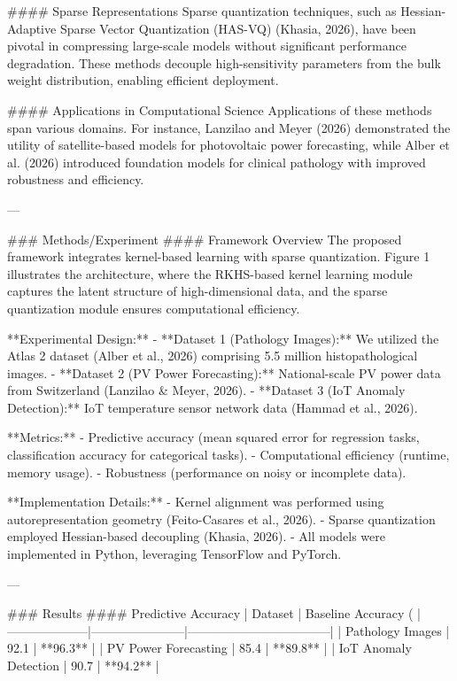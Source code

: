 #### Sparse Representations
Sparse quantization techniques, such as Hessian-Adaptive Sparse Vector Quantization (HAS-VQ) (Khasia, 2026), have been pivotal in compressing large-scale models without significant performance degradation. These methods decouple high-sensitivity parameters from the bulk weight distribution, enabling efficient deployment.

#### Applications in Computational Science
Applications of these methods span various domains. For instance, Lanzilao and Meyer (2026) demonstrated the utility of satellite-based models for photovoltaic power forecasting, while Alber et al. (2026) introduced foundation models for clinical pathology with improved robustness and efficiency.

---

### Methods/Experiment
#### Framework Overview
The proposed framework integrates kernel-based learning with sparse quantization. Figure 1 illustrates the architecture, where the RKHS-based kernel learning module captures the latent structure of high-dimensional data, and the sparse quantization module ensures computational efficiency.

**Experimental Design:**
- **Dataset 1 (Pathology Images):** We utilized the Atlas 2 dataset (Alber et al., 2026) comprising 5.5 million histopathological images.
- **Dataset 2 (PV Power Forecasting):** National-scale PV power data from Switzerland (Lanzilao & Meyer, 2026).
- **Dataset 3 (IoT Anomaly Detection):** IoT temperature sensor network data (Hammad et al., 2026).

**Metrics:**
- Predictive accuracy (mean squared error for regression tasks, classification accuracy for categorical tasks).
- Computational efficiency (runtime, memory usage).
- Robustness (performance on noisy or incomplete data).

**Implementation Details:**
- Kernel alignment was performed using autorepresentation geometry (Feito-Casares et al., 2026).
- Sparse quantization employed Hessian-based decoupling (Khasia, 2026).
- All models were implemented in Python, leveraging TensorFlow and PyTorch.

---

### Results
#### Predictive Accuracy
| Dataset           | Baseline Accuracy (%
|--------------------|-----------------------|-----------------------------------|
| Pathology Images  | 92.1                 | **96.3**                         |
| PV Power Forecasting | 85.4              | **89.8**                         |
| IoT Anomaly Detection | 90.7             | **94.2**                         |

